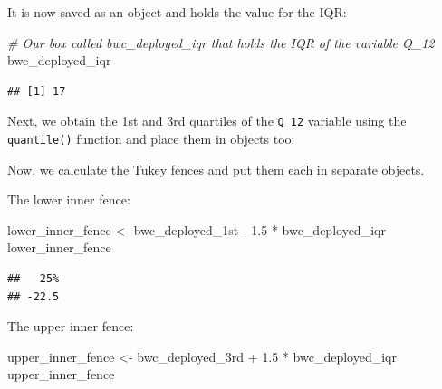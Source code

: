\documentclass[
]{book}
\newenvironment{Shaded}{\begin{snugshade}}{\end{snugshade}}
\newcommand{\AttributeTok}[1]{\textcolor[rgb]{0.77,0.63,0.00}{#1}}
\newcommand{\CommentTok}[1]{\textcolor[rgb]{0.56,0.35,0.01}{\textit{#1}}}
\newcommand{\ConstantTok}[1]{\textcolor[rgb]{0.00,0.00,0.00}{#1}}
\newcommand{\FloatTok}[1]{\textcolor[rgb]{0.00,0.00,0.81}{#1}}
\newcommand{\FunctionTok}[1]{\textcolor[rgb]{0.00,0.00,0.00}{#1}}
\newcommand{\NormalTok}[1]{#1}
\newcommand{\OtherTok}[1]{\textcolor[rgb]{0.56,0.35,0.01}{#1}}
\newcommand{\SpecialCharTok}[1]{\textcolor[rgb]{0.00,0.00,0.00}{#1}}
\begin{document}
It is now saved as an object and holds the value for the IQR:

\begin{Shaded}
\begin{Highlighting}[]
\CommentTok{\# Our \textquotesingle{}box\textquotesingle{} called \textquotesingle{}bwc\_deployed\_iqr\textquotesingle{} that holds the IQR of the variable Q\_12}
\NormalTok{bwc\_deployed\_iqr}
\end{Highlighting}
\end{Shaded}

\begin{verbatim}
## [1] 17
\end{verbatim}

Next, we obtain the 1st and 3rd quartiles of the \texttt{Q\_12} variable using the \texttt{quantile()} function and place them in objects too:

\begin{Shaded}
\end{Shaded}

Now, we calculate the Tukey fences and put them each in separate objects.

The lower inner fence:

\begin{Shaded}
\begin{Highlighting}[]
\NormalTok{lower\_inner\_fence }\OtherTok{\textless{}{-}}\NormalTok{ bwc\_deployed\_1st }\SpecialCharTok{{-}} \FloatTok{1.5} \SpecialCharTok{*}\NormalTok{ bwc\_deployed\_iqr }
\NormalTok{lower\_inner\_fence}
\end{Highlighting}
\end{Shaded}

\begin{verbatim}
##   25% 
## -22.5
\end{verbatim}

The upper inner fence:

\begin{Shaded}
\begin{Highlighting}[]
\NormalTok{upper\_inner\_fence }\OtherTok{\textless{}{-}}\NormalTok{ bwc\_deployed\_3rd }\SpecialCharTok{+} \FloatTok{1.5} \SpecialCharTok{*}\NormalTok{ bwc\_deployed\_iqr }
\NormalTok{upper\_inner\_fence}
\end{Highlighting}
\end{Shaded}
\end{document}

